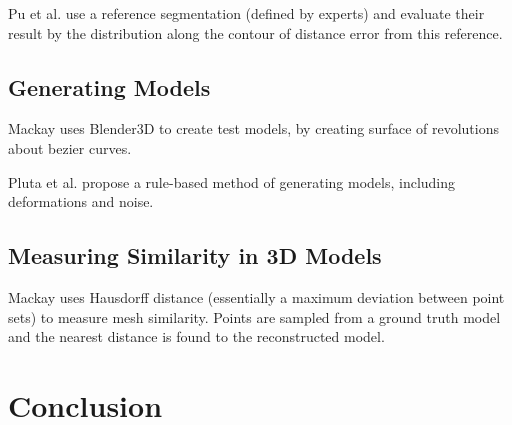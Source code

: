 \documentclass[acmsmall, 12pt]{acmart}
\begin{document}
Pu et al. \cite{pu2008adaptive} use a reference segmentation (defined by experts) and evaluate their result by the distribution along the contour of distance error from this reference.

\subsection{Generating Models}

Mackay \cite{mackay2019robust} uses Blender3D to create test models, by creating surface of revolutions about bezier curves. 

Pluta et al. \cite{pluta2012new} propose a rule-based method of generating models, including deformations and noise.

\subsection{Measuring Similarity in 3D Models}

Mackay \cite{mackay2019robust} uses Hausdorff distance (essentially a maximum deviation between point sets) to measure mesh similarity. Points are sampled from a ground truth model and the nearest distance is found to the reconstructed model.

\section{Conclusion}



\end{document}
